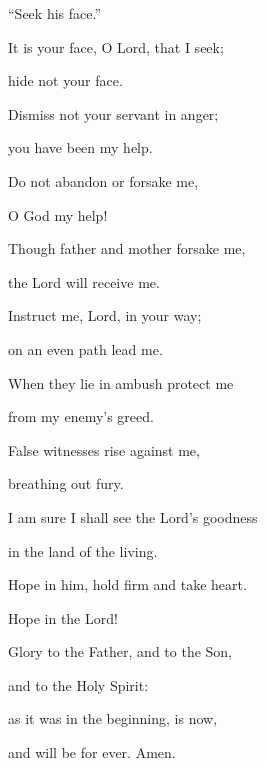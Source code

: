 “Seek his face.”

\noindent It is your face, O Lord, that I seek;~\GreStar{}~\nopagebreak

hide not your face.

\noindent Dismiss not your servant in anger;~\GreStar{}~\nopagebreak

you have been my help.

\noindent Do not abandon or forsake me,~\GreStar{}~\nopagebreak

O God my help!

\noindent Though father and mother forsake me,~\GreStar{}~\nopagebreak

the Lord will receive me.

\noindent Instruct me, Lord, in your way;~\GreStar{}~\nopagebreak

on an even path lead me.

\noindent When they lie in ambush protect me~\GreStar{}~\nopagebreak

from my enemy’s greed.

\noindent False witnesses rise against me,~\GreStar{}~\nopagebreak

breathing out fury.

\noindent I am sure I shall see the Lord’s goodness~\GreStar{}~\nopagebreak

in the land of the living.

\noindent Hope in him, hold firm and take heart.~\GreStar{}~\nopagebreak

Hope in the Lord!

\noindent Glory to the Father, and to the Son,~\GreStar{}~\nopagebreak

and to the Holy Spirit:

\noindent as it was in the beginning, is now,~\GreStar{}~\nopagebreak

and will be for ever. Amen.
